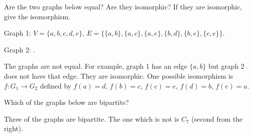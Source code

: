 \begin{questions}
	
	
	

	


\question Are the two graphs below equal?  Are they isomorphic?  If they are isomorphic, give the isomorphism.

Graph 1: $V = \{a,b,c,d,e\}$, $E = \{\{a,b\}, \{a,c\}, \{a,e\}, \{b,d\}, \{b,e\}, \{c,e\}\}$.

Graph 2: .
	
	
	\begin{answer}
		The graphs are not equal.  For example, graph 1 has an edge $\{a,b\}$ but graph 2 does not have that edge.  They are isomorphic.  One possible isomorphism is $f:G_1 \to G_2$ defined by $f(a) = d$, $f(b) = c$, $f(c) = e$, $f(d) = b$, $f(e) = a$.
	\end{answer}
	
	


	
	


	





	
	

\question Which of the graphs below are bipartite?  

\begin{center}
  \hfill
  \hfill
  \hfill 
\end{center}

	\begin{answer}
		Three of the graphs are bipartite.  The one which is not is $C_7$ (second from the right).
	\end{answer}
	

\end{questions}
